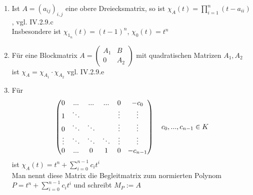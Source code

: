 \begin{example}
	\begin{enumerate}
		\item Ist $A=(a_{ij})_{i,j}$ eine obere Dreiecksmatrix, so ist $\chi_A(t)=\prod_{i=1}^n (t-a_{ii})$, vgl. IV.2.9.c \\ %
		Insbesondere ist $\chi_{1_n}(t)=(t-1)^n$, $\chi_0(t)=t^n$
		\item Für eine Blockmatrix $A=\begin{pmatrix}A_1&B \\ 0&A_2\end{pmatrix}$ mit quadratischen Matrizen $A_1,A_2$ ist $\chi_A=\chi_{A_1}\cdot \chi_{A_2}$ vgl. IV.2.9.e %
		\item Für
		\begin{align}
			\begin{pmatrix}
			0&...&...&...&0&-c_0  \\ 
			1& \ddots&\;&\;&\vdots&\vdots  \\ 
			0&\ddots&\ddots&\;&\vdots&\vdots  \\ 
			\vdots&\ddots&\ddots&\ddots&\vdots&\vdots  \\ 
			0&...&0&1&0&-c_{n-1} 
			\end{pmatrix} \quad c_0,...,c_{n-1}\in K \notag
		\end{align}
		ist $\chi_A(t)=t^n+\sum_{i=0}^{n-1} c_i t^i$ \\
		Man nennt diese Matrix die Begleitmatrix zum normierten Polynom $P=t^n+\sum_{i=0}^{n-1} c_i t^i$ und schreibt $M_P:=A$
	\end{enumerate}
\end{example}
